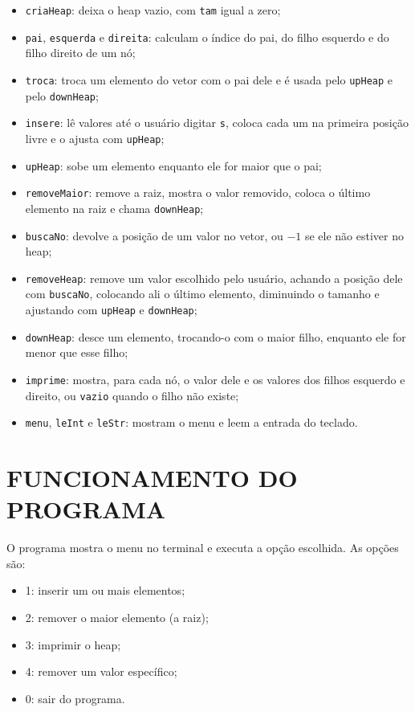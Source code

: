 \documentclass[12pt,openany,oneside,a4paper,english,brazil,sumario=tradicional]{abntex2}
\begin{document}
\begin{itemize}
  \item \texttt{criaHeap}: deixa o heap vazio, com \texttt{tam} igual a zero;
  \item \texttt{pai}, \texttt{esquerda} e \texttt{direita}: calculam o índice do pai, do filho esquerdo e do filho direito de um nó;
  \item \texttt{troca}: troca um elemento do vetor com o pai dele e é usada pelo \texttt{upHeap} e pelo \texttt{downHeap};
  \item \texttt{insere}: lê valores até o usuário digitar \texttt{s}, coloca cada um na primeira posição livre e o ajusta com \texttt{upHeap};
  \item \texttt{upHeap}: sobe um elemento enquanto ele for maior que o pai;
  \item \texttt{removeMaior}: remove a raiz, mostra o valor removido, coloca o último elemento na raiz e chama \texttt{downHeap};
  \item \texttt{buscaNo}: devolve a posição de um valor no vetor, ou $-1$ se ele não estiver no heap;
  \item \texttt{removeHeap}: remove um valor escolhido pelo usuário, achando a posição dele com \texttt{buscaNo}, colocando ali o último elemento, diminuindo o tamanho e ajustando com \texttt{upHeap} e \texttt{downHeap};
  \item \texttt{downHeap}: desce um elemento, trocando-o com o maior filho, enquanto ele for menor que esse filho;
  \item \texttt{imprime}: mostra, para cada nó, o valor dele e os valores dos filhos esquerdo e direito, ou \texttt{vazio} quando o filho não existe;
  \item \texttt{menu}, \texttt{leInt} e \texttt{leStr}: mostram o menu e leem a entrada do teclado.
\end{itemize}

\section{FUNCIONAMENTO DO PROGRAMA}

O programa mostra o menu no terminal e executa a opção escolhida. As opções são:

\begin{itemize}
  \item 1: inserir um ou mais elementos;
  \item 2: remover o maior elemento (a raiz);
  \item 3: imprimir o heap;
  \item 4: remover um valor específico;
  \item 0: sair do programa.
\end{itemize}
\end{document}
